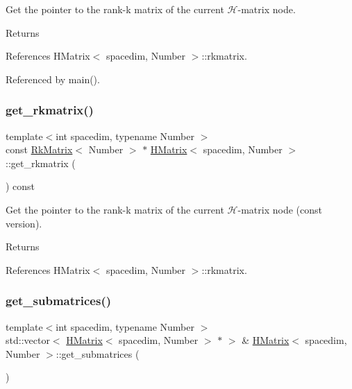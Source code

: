 Get the pointer to the rank-\/k matrix of the current $\mathcal{H}$-\/matrix node. \begin{DoxyReturn}{Returns}

\end{DoxyReturn}


References H\+Matrix$<$ spacedim, Number $>$\+::rkmatrix.



Referenced by main().

\mbox{\label{classHMatrix_a64c81db6357d0e00b82fd523af001ae5}} 
\subsubsection{\texorpdfstring{get\+\_\+rkmatrix()}{get\_rkmatrix()}\hspace{0.1cm}{\footnotesize\ttfamily [2/2]}}
{\footnotesize\ttfamily template$<$int spacedim, typename Number $>$ \\
const \hyperlink{classRkMatrix}{Rk\+Matrix}$<$ Number $>$ $\ast$ \hyperlink{classHMatrix}{H\+Matrix}$<$ spacedim, Number $>$\+::get\+\_\+rkmatrix (\begin{DoxyParamCaption}{ }\end{DoxyParamCaption}) const}

Get the pointer to the rank-\/k matrix of the current $\mathcal{H}$-\/matrix node (const version). \begin{DoxyReturn}{Returns}

\end{DoxyReturn}


References H\+Matrix$<$ spacedim, Number $>$\+::rkmatrix.

\mbox{\label{classHMatrix_a0572b2c0484ce618db0034e3bc7988ed}} 
\subsubsection{\texorpdfstring{get\+\_\+submatrices()}{get\_submatrices()}\hspace{0.1cm}{\footnotesize\ttfamily [1/2]}}
{\footnotesize\ttfamily template$<$int spacedim, typename Number $>$ \\
std\+::vector$<$ \hyperlink{classHMatrix}{H\+Matrix}$<$ spacedim, Number $>$ $\ast$ $>$ \& \hyperlink{classHMatrix}{H\+Matrix}$<$ spacedim, Number $>$\+::get\+\_\+submatrices (\begin{DoxyParamCaption}{ }\end{DoxyParamCaption})}


